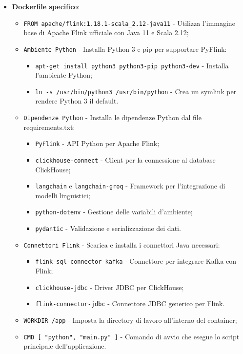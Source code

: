 \documentclass[10pt]{article}
\begin{document}
\begin{itemize}
        \item \textbf{Dockerfile specifico}:
        \begin{itemize}
            \item \texttt{FROM apache/flink:1.18.1-scala\_2.12-java11} - Utilizza l'immagine base di Apache Flink ufficiale con Java 11 e Scala 2.12;
            \item \texttt{Ambiente Python} - Installa Python 3 e pip per supportare PyFlink:
            \begin{itemize}
                \item \texttt{apt-get install python3 python3-pip python3-dev} - Installa l'ambiente Python;
                \item \texttt{ln -s /usr/bin/python3 /usr/bin/python} - Crea un symlink per rendere Python 3 il default.
            \end{itemize}
            \item \texttt{Dipendenze Python} - Installa le dipendenze Python dal file requirements.txt:
            \begin{itemize}
                \item \texttt{PyFlink} - API Python per Apache Flink;
                \item \texttt{clickhouse-connect} - Client per la connessione al database ClickHouse;
                \item \texttt{langchain} e \texttt{langchain-groq} - Framework per l'integrazione di modelli linguistici;
                \item \texttt{python-dotenv} - Gestione delle variabili d'ambiente;
                \item \texttt{pydantic} - Validazione e serializzazione dei dati.
            \end{itemize}
            \item \texttt{Connettori Flink} - Scarica e installa i connettori Java necessari:
            \begin{itemize}
                \item \texttt{flink-sql-connector-kafka} - Connettore per integrare Kafka con Flink;
                \item \texttt{clickhouse-jdbc} - Driver JDBC per ClickHouse;
                \item \texttt{flink-connector-jdbc} - Connettore JDBC generico per Flink.
            \end{itemize}
            \item \texttt{WORKDIR /app} - Imposta la directory di lavoro all'interno del container;
            \item \texttt{CMD [ "python", "main.py" ]} - Comando di avvio che esegue lo script principale dell'applicazione.
        \end{itemize}
        

\end{itemize}
\end{document}
